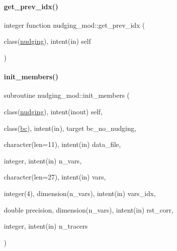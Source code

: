 \mbox{\label{namespacenudging__mod_a762a7889128eda49397f056becc83000}} 
\paragraph{\texorpdfstring{get\+\_\+prev\+\_\+idx()}{get\_prev\_idx()}}
{\footnotesize\ttfamily integer function nudging\+\_\+mod\+::get\+\_\+prev\+\_\+idx (\begin{DoxyParamCaption}\item[{class(\mbox{\hyperlink{structnudging__mod_1_1nudging}{nudging}}), intent(in)}]{self }\end{DoxyParamCaption})\hspace{0.3cm}{\ttfamily [private]}}

\mbox{\label{namespacenudging__mod_a396abff37a5fd2c555d5118b36e1e765}} 
\paragraph{\texorpdfstring{init\+\_\+members()}{init\_members()}}
{\footnotesize\ttfamily subroutine nudging\+\_\+mod\+::init\+\_\+members (\begin{DoxyParamCaption}\item[{class(\mbox{\hyperlink{structnudging__mod_1_1nudging}{nudging}}), intent(inout)}]{self,  }\item[{class(\mbox{\hyperlink{structbc__mod_1_1bc}{bc}}), intent(in), target}]{bc\+\_\+no\+\_\+nudging,  }\item[{character(len=11), intent(in)}]{data\+\_\+file,  }\item[{integer, intent(in)}]{n\+\_\+vars,  }\item[{character(len=27), intent(in)}]{vars,  }\item[{integer(4), dimension(n\+\_\+vars), intent(in)}]{vars\+\_\+idx,  }\item[{double precision, dimension(n\+\_\+vars), intent(in)}]{rst\+\_\+corr,  }\item[{integer, intent(in)}]{n\+\_\+tracers }\end{DoxyParamCaption})\hspace{0.3cm}{\ttfamily [private]}}

